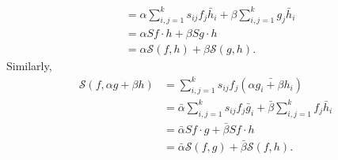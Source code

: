 \documentclass[11pt, oneside, a4paper]{article}
\begin{document}
\begin{rmk}
{\begin{align*}
        &= \alpha \sum_{i,j=1}^k s_{ij}f_j\bar{h}_i + \beta \sum_{i,j=1}^k g_j\bar{h}_i\\
        &= \alpha Sf\cdot h + \beta Sg\cdot h\\
        &= \alpha\mathcal{S}(f,h) + \beta\mathcal{S}(g,h).
    \end{align*}
    Similarly,
    \begin{align*}
        \mathcal{S}(f, \alpha g + \beta h)
        &= \sum_{i,j=1}^k s_{ij}f_j(\bar{\alpha g_i + \beta h_i})\\
        &= \bar{\alpha}\sum_{i,j=1}^k s_{ij}f_j\bar{g}_i + \bar{\beta}\sum_{i,j=1}^k f_j \bar{h}_i\\
        &= \bar{\alpha}Sf\cdot g + \bar{\beta}Sf\cdot h\\
        &= \bar{\alpha}\mathcal{S}(f,g) + \bar{\beta}\mathcal{S}(f,h).
    \end{align*}
    }
\end{rmk}
\end{document}
